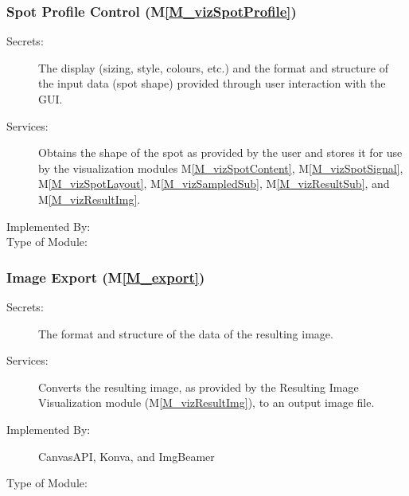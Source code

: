 \documentclass[12pt, titlepage]{article}
\newcommand{\mref}[1]{M\ref{#1}}
\begin{document}
\subsubsection{Spot Profile Control (\mref{M_vizSpotProfile})}
\begin{description}
\item[Secrets:]The display (sizing, style, colours, etc.) and
  the format and structure of the input data (spot shape) provided
  through user interaction with the GUI.
\item[Services:] Obtains the shape of the spot as provided by the user and stores it for use
  by the visualization modules \mref{M_vizSpotContent}, \mref{M_vizSpotSignal}, \mref{M_vizSpotLayout},
  \mref{M_vizSampledSub}, \mref{M_vizResultSub}, and \mref{M_vizResultImg}.
\item[Implemented By:] \progname{}
\item[Type of Module:] 
\end{description}


\subsubsection{Image Export (\mref{M_export})}
\begin{description}
\item[Secrets:]The format and structure of the data of the resulting image.
\item[Services:]Converts the resulting image, as provided by the 
  Resulting Image Visualization module (\mref{M_vizResultImg}), to an output image file.
\item[Implemented By:] CanvasAPI, Konva, and ImgBeamer
\item[Type of Module:] 
\end{description}
\end{document}
